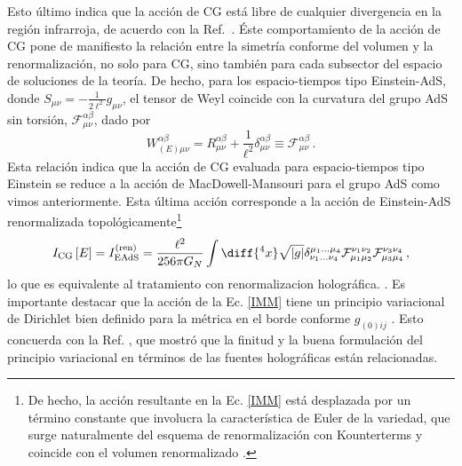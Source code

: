 \documentclass[../Main.tex]{subfiles}
\begin{document}
Esto último indica que la acción de CG está libre de cualquier divergencia en la región infrarroja, de acuerdo con la Ref.~\cite{Grumiller:2013mxa}. Éste comportamiento de la acción de CG pone de manifiesto la relación entre la simetría conforme del volumen y la renormalización, no solo para CG, sino también para cada subsector del espacio de soluciones de la teoría. De hecho, para los espacio-tiempos tipo Einstein-AdS, donde $S_{\mu \nu} = -\frac{1}{2\ell^2} g_{\mu \nu}$, el tensor de Weyl coincide con la curvatura del grupo AdS sin torsión, $\mathcal{F}^{\alpha \beta}_{\mu \nu}$, dado por 
\begin{equation}\label{WeylE}
W^{\alpha \beta}_{\left(E\right) \mu \nu} = R^{\alpha \beta}_{\mu \nu} + \frac{1}{\ell^2}  \delta^{\alpha \beta}_{\mu \nu} \equiv \mathcal{F}^{\alpha \beta}_{\mu \nu} \,.
\end{equation}
Esta relación indica que la acción de CG evaluada para espacio-tiempos tipo Einstein se reduce a la acción de MacDowell-Mansouri para el grupo AdS \cite{MacDowell:1977jt} como vimos anteriormente. Esta última acción corresponde a la acción de Einstein-AdS renormalizada topológicamente\footnote{De hecho, la acción resultante en la Ec. \eqref{IMM} está desplazada por un término constante que involucra la característica de Euler de la variedad, que surge naturalmente del esquema de renormalización con Kounterterms y coincide con el volumen renormalizado \cite{Anastasiou:2018mfk}.} \cite{Miskovic:2009bm}
\begin{equation}
I_{\rm CG} \left[E\right] = I^{\rm (ren)}_{\rm EAdS}=\frac{\ell^2}{256 \pi G_{N}} \int\diff{^4x}\sqrt{|g|} \delta^{\mu_1\ldots\mu_4}_{\nu_1\ldots\nu_4}\mathcal{F}^{\nu_1\nu_2}_{\mu_1\mu_2}\mathcal{F}^{\nu_3\nu_4}_{\mu_3\mu_4} \,,
\label{IMM}
\end{equation}
lo que es equivalente al tratamiento con renormalizacion holográfica. \cite{Anastasiou:2020zwc}.
Es importante destacar que la acción de la Ec. \eqref{IMM} tiene un principio variacional de Dirichlet bien definido para la métrica en el borde conforme $g_{(0)ij}$ \cite{Anastasiou:2019ldc}. Esto concuerda con la Ref. \cite{Papadimitriou:2005ii}, que mostró que la finitud y la buena formulación del principio variacional en términos de las fuentes holográficas están relacionadas.
\end{document}
